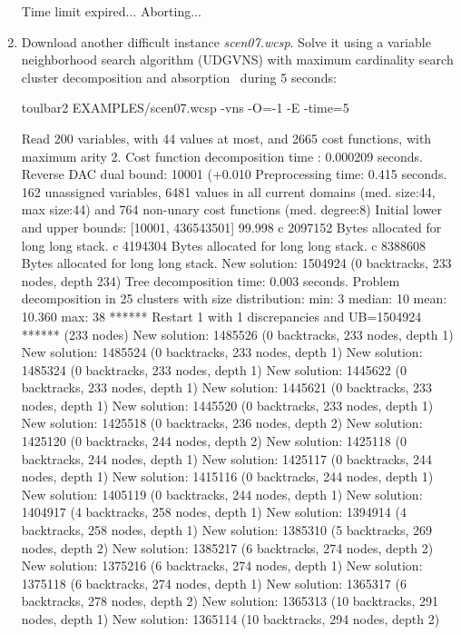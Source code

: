 \begin{enumerate}
{\begin{DoxyCode}
Time limit expired... Aborting...
\end{DoxyCode}}
\item Download another difficult instance {\em scen07.wcsp}. Solve it using a variable neighborhood search algorithm (UDGVNS) with maximum cardinality search cluster decomposition and absorption~\cite{Ouali17} during 5 seconds:
\begin{DoxyCode}
	toulbar2 EXAMPLES/scen07.wcsp -vns -O=-1 -E -time=5
\end{DoxyCode}
{\scriptsize
\begin{DoxyCode}
Read 200 variables, with 44 values at most, and 2665 cost functions, with maximum arity 2.
Cost function decomposition time : 0.000209 seconds.
Reverse DAC dual bound: 10001 (+0.010%
Preprocessing time: 0.415 seconds.
162 unassigned variables, 6481 values in all current domains (med. size:44, max size:44) and 764 non-unary cost functions (med. degree:8)
Initial lower and upper bounds: [10001, 436543501] 99.998%
c 2097152 Bytes allocated for long long stack.
c 4194304 Bytes allocated for long long stack.
c 8388608 Bytes allocated for long long stack.
New solution: 1504924 (0 backtracks, 233 nodes, depth 234)
Tree decomposition time: 0.003 seconds.
Problem decomposition in 25 clusters with size distribution: min: 3 median: 10 mean: 10.360 max: 38
****** Restart 1 with 1 discrepancies and UB=1504924 ****** (233 nodes)
New solution: 1485526 (0 backtracks, 233 nodes, depth 1)
New solution: 1485524 (0 backtracks, 233 nodes, depth 1)
New solution: 1485324 (0 backtracks, 233 nodes, depth 1)
New solution: 1445622 (0 backtracks, 233 nodes, depth 1)
New solution: 1445621 (0 backtracks, 233 nodes, depth 1)
New solution: 1445520 (0 backtracks, 233 nodes, depth 1)
New solution: 1425518 (0 backtracks, 236 nodes, depth 2)
New solution: 1425120 (0 backtracks, 244 nodes, depth 2)
New solution: 1425118 (0 backtracks, 244 nodes, depth 1)
New solution: 1425117 (0 backtracks, 244 nodes, depth 1)
New solution: 1415116 (0 backtracks, 244 nodes, depth 1)
New solution: 1405119 (0 backtracks, 244 nodes, depth 1)
New solution: 1404917 (4 backtracks, 258 nodes, depth 1)
New solution: 1394914 (4 backtracks, 258 nodes, depth 1)
New solution: 1385310 (5 backtracks, 269 nodes, depth 2)
New solution: 1385217 (6 backtracks, 274 nodes, depth 2)
New solution: 1375216 (6 backtracks, 274 nodes, depth 1)
New solution: 1375118 (6 backtracks, 274 nodes, depth 1)
New solution: 1365317 (6 backtracks, 278 nodes, depth 2)
New solution: 1365313 (10 backtracks, 291 nodes, depth 1)
New solution: 1365114 (10 backtracks, 294 nodes, depth 2)

\end{DoxyCode}}
\end{enumerate}

